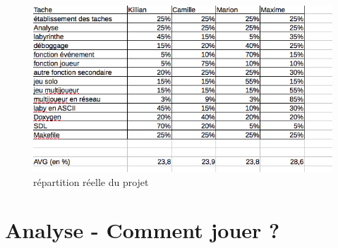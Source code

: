 \documentclass[12pt,a4paper,twoside]{article}
\begin{document}
\begin {figure}[h]
\includegraphics[width=1.1\textwidth]{pourc.png}
\caption{\label {ref4}répartition réelle du projet}
\end {figure}
\newpage
\section{Analyse - Comment jouer ?}
\end{document}
